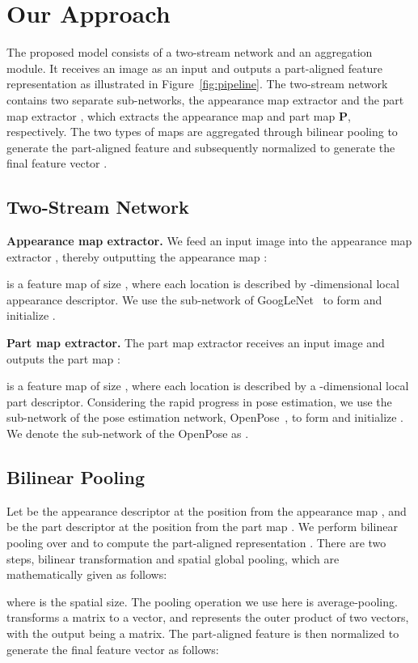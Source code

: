 \documentclass{llncs}
\begin{document}
\section{Our Approach}
The proposed model consists of a two-stream network and an aggregation module. It receives an image  as an input and outputs a part-aligned feature representation  as illustrated in Figure~\ref{fig:pipeline}. The two-stream network contains two separate sub-networks, the appearance map extractor  and the part map extractor , which extracts the appearance map  and part map \textbf{P}, respectively. The two types of maps are aggregated through bilinear pooling to generate the part-aligned feature  and subsequently normalized to generate the final feature vector .

\subsection{Two-Stream Network}
\noindent\textbf{Appearance map extractor.}
We feed an input image  into the
appearance map extractor , thereby
outputting the appearance map
:

 is a feature map of size , where each location is described by -dimensional local appearance descriptor. We use the sub-network of GoogLeNet~\cite{inceptionv1} to form and initialize .

\noindent\textbf{Part map extractor.}
The part map extractor  receives an input image  and outputs the part map :

 is a feature map of size , where each location is described by a -dimensional local part descriptor. 
Considering the rapid progress in pose estimation, we use the sub-network of the pose estimation network, OpenPose~\cite{conf/cvpr/cao17}, to form and initialize . We denote the sub-network of the OpenPose as .

\subsection{Bilinear Pooling}
Let  be the appearance descriptor at the position  from the appearance map , and  be the part descriptor at the position  from the part map .
We perform bilinear pooling over  and  to compute the part-aligned representation .
There are two steps,
bilinear transformation
and spatial global pooling,
which are mathematically given as follows:

where  is the spatial size. The pooling operation we use here is average-pooling. 
 transforms a matrix to a vector,
and
 represents the outer product of two vectors,
with the output being a matrix. 
The part-aligned feature  is then normalized to generate the final feature vector  as follows:
\end{document}
